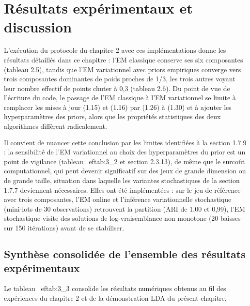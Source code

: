 \section{Résultats expérimentaux et discussion}
L'exécution du protocole du chapitre 2 avec ces implémentations donne les résultats détaillés dans ce chapitre : l'EM classique conserve ses six composantes (tableau 2.5), tandis que l'EM variationnel avec priors empiriques converge vers trois composantes dominantes de poids proches de 1/3, les trois autres voyant leur nombre effectif de points chuter à 0,3 (tableau 2.6). Du point de vue de l'écriture du code, le passage de l'EM classique à l'EM variationnel se limite à remplacer les mises à jour (1.15) et (1.16) par (1.26) à (1.30) et à ajouter les hyperparamètres des priors, alors que les propriétés statistiques des deux algorithmes diffèrent radicalement.

Il convient de nuancer cette conclusion par les limites identifiées à la section 1.7.9 : la sensibilité de l'EM variationnel au choix des hyperparamètres du prior est un point de vigilance (tableau~
ef{tab:3_2} et section 2.3.13), de même que le surcoût computationnel, qui peut devenir significatif sur des jeux de grande dimension ou de grande taille, situation dans laquelle les variantes stochastiques de la section 1.7.7 deviennent nécessaires. Elles ont été implémentées : sur le jeu de référence avec trois composantes, l'EM online et l'inférence variationnelle stochastique (mini-lots de 30 observations) retrouvent la partition (ARI de 1,00 et 0,99), l'EM stochastique visite des solutions de log-vraisemblance non monotone (20 baisses sur 150 itérations) avant de se stabiliser.

\subsection{Synthèse consolidée de l'ensemble des résultats expérimentaux}
Le tableau~
ef{tab:3_3} consolide les résultats numériques obtenus au fil des expériences du chapitre 2 et de la démonstration LDA du présent chapitre.

